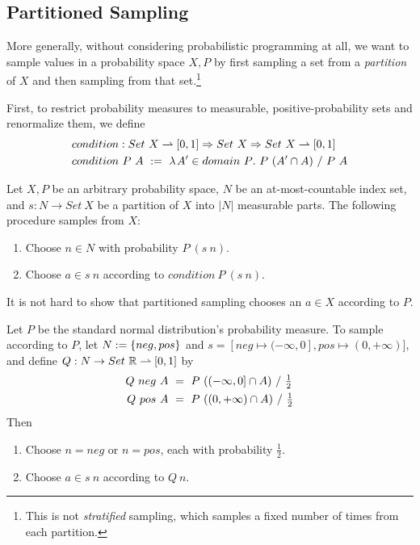 \subsection{Partitioned Sampling}

More generally, without considering probabilistic programming at all, we want to sample values in a probability space $X,P$ by first sampling a set from a \emph{partition} of $X$ and then sampling from that set.\footnote{This is not \emph{stratified} sampling, which samples a fixed number of times from each partition.}

First, to restrict probability measures to measurable, positive-probability sets and renormalize them, we define
\begin{equation}
\begin{aligned}
	&condition : Set~X \rightharpoonup [0,1] \Rightarrow Set~X \Rightarrow Set~X \rightharpoonup [0,1] \\
	&condition~P~A\ :=\ \lambda\mspace{2mu}{A' \in domain~P}\ldotp\, P~(A' \cap A)~{/}~P~A
\end{aligned}
\end{equation}

\begin{definition}
\label{def:partitioned-sampling}
Let $X,P$ be an arbitrary probability space, $N$ be an at-most-countable index set, and $s : N \to Set~X$ be a partition of $X$ into $|N|$ measurable parts. The following procedure samples from $X$:
\begin{enumerate}
	\item Choose $n \in N$ with probability $P~(s~n)$.
	\item Choose $a \in s~n$ according to $condition~P~(s~n)$.
\end{enumerate}
\end{definition}

It is not hard to show that partitioned sampling chooses an $a \in X$ according to $P$.

\begin{example}
\label{ex:partitioned-sampling}
Let $P$ be the standard normal distribution's probability measure.
To sample according to $P$, let $N := \{{neg,pos}\}$ and $s = [neg \mapsto (-\infty,0], pos \mapsto (0,+\infty)]$, and define $Q : N \to Set~\mathbb{R} \rightharpoonup [0,1]$ by
\begin{equation}
\begin{aligned}
	Q~neg~A\ &=\ P~((-\infty,0] \cap A)~{/}~\tfrac{1}{2} \\
	Q~pos~A\ &=\ P~((0,+\infty) \cap A)~{/}~\tfrac{1}{2}
\end{aligned}
\end{equation}
Then
\begin{enumerate}
	\item Choose $n = neg$ or $n = pos$, each with probability $\frac{1}{2}$.
	\item Choose $a \in s~n$ according to $Q~n$.\exampleqed
\end{enumerate}
\end{example}

